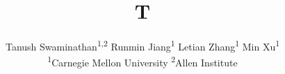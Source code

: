 \documentclass{article}
\begin{document}
\author{
  Tanush Swaminathan\textsuperscript{1,2} \quad
  Runmin Jiang\textsuperscript{1} \quad
  Letian Zhang\textsuperscript{1} \quad
  Min Xu\textsuperscript{1} \\[5pt]
  \textsuperscript{1}Carnegie Mellon University \quad
  \textsuperscript{2}Allen Institute
}
\title{T}
\maketitle
\end{document}
